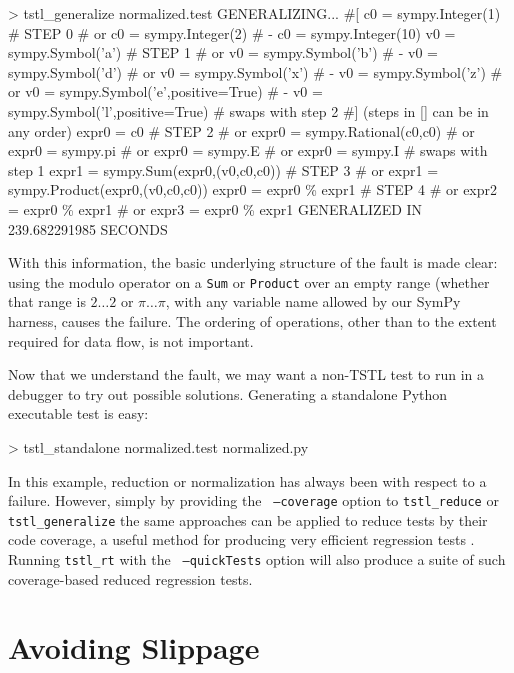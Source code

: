 {\scriptsize
\begin{code}
 > tstl\_generalize normalized.test
 GENERALIZING...
 \#[
 c0 = sympy.Integer(1)                               \# STEP 0
 \#  or c0 = sympy.Integer(2) 
 \#   - c0 = sympy.Integer(10) 
 v0 = sympy.Symbol('a')                              \# STEP 1
 \#  or v0 = sympy.Symbol('b') 
 \#   - v0 = sympy.Symbol('d') 
 \#  or v0 = sympy.Symbol('x') 
 \#   - v0 = sympy.Symbol('z') 
 \#  or v0 = sympy.Symbol('e',positive=True) 
 \#   - v0 = sympy.Symbol('l',positive=True) 
 \#  swaps with step 2
 \#] (steps in [] can be in any order)
 expr0 = c0                                          \# STEP 2
 \#  or expr0 = sympy.Rational(c0,c0) 
 \#  or expr0 = sympy.pi 
 \#  or expr0 = sympy.E 
 \#  or expr0 = sympy.I 
 \#  swaps with step 1
 expr1 = sympy.Sum(expr0,(v0,c0,c0))                 \# STEP 3
 \#  or expr1 = sympy.Product(expr0,(v0,c0,c0)) 
 expr0 = expr0 \% expr1                               \# STEP 4
 \#  or expr2 = expr0 \% expr1 
 \#  or expr3 = expr0 \% expr1 
 GENERALIZED IN 239.682291985 SECONDS
\end{code}
}

With this information, the basic underlying structure
of the fault is made clear:  using the modulo operator on a {\tt Sum}
or {\tt Product} over an empty range (whether that range is $2 \ldots 2$ or
$\pi \ldots \pi$, with any variable name allowed by our SymPy harness,
causes the failure.  The ordering of operations, other than to the
extent required for data flow, is not important.

Now that we understand the fault, we may want a non-TSTL test to run
in a debugger to try out possible solutions.  Generating a standalone
Python executable
test is easy:

{\scriptsize
\begin{code}
 > tstl\_standalone normalized.test normalized.py
\end{code}
}

In this example, reduction or normalization has always been with
respect to a failure.  However, simply by providing the {\tt
  --coverage} option to {\tt tstl\_reduce} or {\tt tstl\_generalize}
the same approaches can be applied to reduce tests by their code
coverage, a useful method for producing very efficient regression tests
\cite{icst2014,stvrcausereduce}.  Running {\tt tstl\_rt} with the {\tt
  --quickTests} option will also produce a suite of such
coverage-based reduced regression tests.

\section{Avoiding Slippage}

